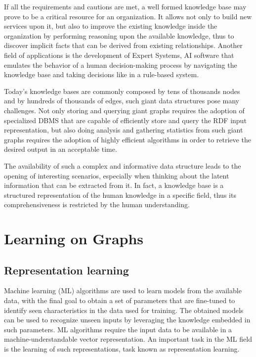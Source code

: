 \documentclass[%
    corpo=13.5pt,
    twoside,
    oldstyle,
    tipotesi=magistrale,
    greek,
    evenboxes
]{toptesi}
\begin{document}
If all the requirements and cautions are met, a well formed knowledge base may
prove to be a critical resource for an organization. It allows not only to
build new services upon it, but also to improve the existing knowledge inside
the organization by performing reasoning upon the available knowledge, thus
to discover implicit facts that can be derived from existing relationships.
Another field of applications is the development of Expert Systems, AI
software that emulates the behavior of a human decision-making process by
navigating the knowledge base and taking decisions like in a rule-based system.

Today's knowledge bases are commonly composed by tens of
thousands nodes and by hundreds of thousands of edges, such giant data
structures pose many challenges.
Not only storing and querying giant graphs requires the adoption of
specialized DBMS that are capable of efficiently store and query the RDF
input representation, but also doing analysis and gathering statistics from
such giant graphs requires the adoption of highly efficient algorithms in
order to retrieve the desired output in an acceptable time.

The availability of such a complex and informative data structure leads
to the opening of interesting scenarios, especially when thinking about
the latent information that can be extracted from it. In
fact, a knowledge base is a structured representation of the
human knowledge in a specific field, thus its comprehensiveness is restricted
by the human understanding.


\section{Learning on Graphs}

\subsection{Representation learning}

Machine learning (ML) algorithms are used to learn models from the
available data, with the final goal to obtain a set of parameters
that are fine-tuned to identify seen characteristics in the data
used for training. The obtained models can be used to
recognize unseen inputs by leveraging the knowledge embedded
in such parameters.
ML algorithms require the input data to be available in a
machine-understandable vector representation. An important task
in the ML field is the learning of such representations, task known
as representation learning.
\end{document}
